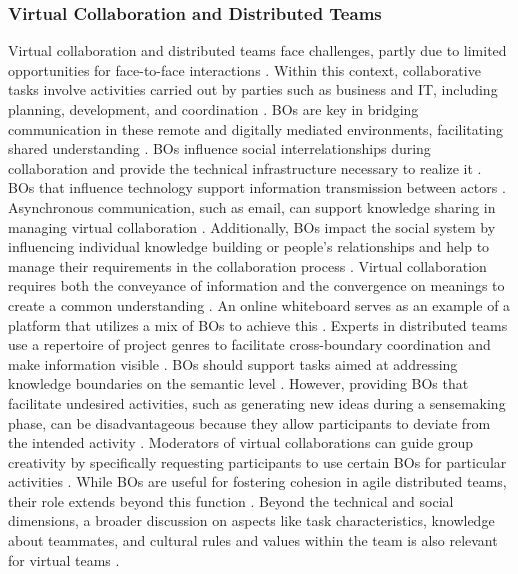 \documentclass[12pt,oneside]{article}
\begin{document}
\subsubsection{Virtual Collaboration and Distributed Teams} \label{virtual-collaboration}

Virtual collaboration and distributed teams face challenges, partly due to limited opportunities for face-to-face interactions \citep[513]{mccarthy2020building}. Within this context, collaborative tasks involve activities carried out by parties such as business and \ac{IT}, including planning, development, and coordination \citep[6]{jentsch2014shared}. \ac{BO}s are key in bridging communication in these remote and digitally mediated environments, facilitating shared understanding \citep[1091]{marheineke2016bridging}. \ac{BO}s influence social interrelationships during collaboration and provide the technical infrastructure necessary to realize it \citep[4]{marheineke2016importance}. \ac{BO}s that influence technology support information transmission between actors \citep[13]{marheineke2016importance}. Asynchronous communication, such as email, can support knowledge sharing in managing virtual collaboration \citep[20]{marheineke2016importance}. 
Additionally, \ac{BO}s impact the social system by influencing individual knowledge building or people's relationships and help to manage their requirements in the collaboration process \citep[4-5]{marheineke2016importance}. Virtual collaboration requires both the conveyance of information and the convergence on meanings to create a common understanding \citep[1091]{marheineke2016bridging}. An online whiteboard serves as an example of a platform that utilizes a mix of \ac{BO}s to achieve this \citep[1091]{marheineke2016bridging}. Experts in distributed teams use a repertoire of project genres to facilitate cross-boundary coordination and make information visible \citep[465]{hsiao2012collaborative}. \ac{BO}s should support tasks aimed at addressing knowledge boundaries on the semantic level \citep[21]{marheineke2016importance}. \newline 
However, providing \ac{BO}s that facilitate undesired activities, such as generating new ideas during a sensemaking phase, can be disadvantageous because they allow participants to deviate from the intended activity \citep[1092]{marheineke2016bridging}. Moderators of virtual collaborations can guide group creativity by specifically requesting participants to use certain \ac{BO}s for particular activities \citep[1092]{marheineke2016bridging}. While \ac{BO}s are useful for fostering cohesion in agile distributed teams, their role extends beyond this function \citep[519]{mccarthy2020building}. Beyond the technical and social dimensions, a broader discussion on aspects like task characteristics, knowledge about teammates, and cultural rules and values within the team is also relevant for virtual teams \citep[10]{jentsch2014shared}.
\end{document}
